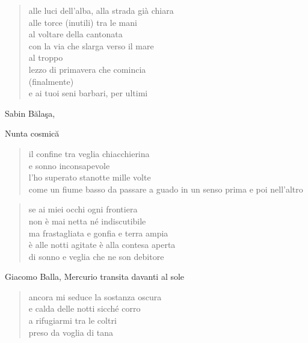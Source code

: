 	\begin{verse}
		alle luci dell'alba, alla strada già chiara\\
		alle torce (inutili) tra le mani\\
		al voltare della cantonata\\
		con la via che slarga verso il mare\\
		al troppo\\
		lezzo di primavera che comincia\\
		(finalmente)\\
		e ai tuoi seni barbari, per ultimi
	\end{verse}

\clearpage


\begin{artItem}
	Sabin Bălaşa, \begin{otherlanguage}{romanian}%
		Nunta cosmică%
	\end{otherlanguage}
\end{artItem}

	\begin{verse}
		il confine tra veglia chiacchierina\\
		e sonno inconsapevole\\
		l’ho superato stanotte mille volte\\
		come un fiume basso da passare a guado
		in un senso prima e poi nell’altro
	\end{verse}

	\begin{verse}
		se ai miei occhi ogni frontiera\\
		non è mai netta né indiscutibile\\
		ma frastagliata e gonfia e terra ampia\\
		è alle notti agitate è alla contesa aperta\\
		di sonno e veglia che ne son debitore
	\end{verse}

\clearpage


\begin{artItem}
	Giacomo Balla, Mercurio transita davanti al sole
\end{artItem}

	\begin{verse}
		ancora mi seduce la sostanza oscura\\
		e calda delle notti sicché corro\\
		a rifugiarmi tra le coltri\\
		preso da voglia di tana
	\end{verse}

